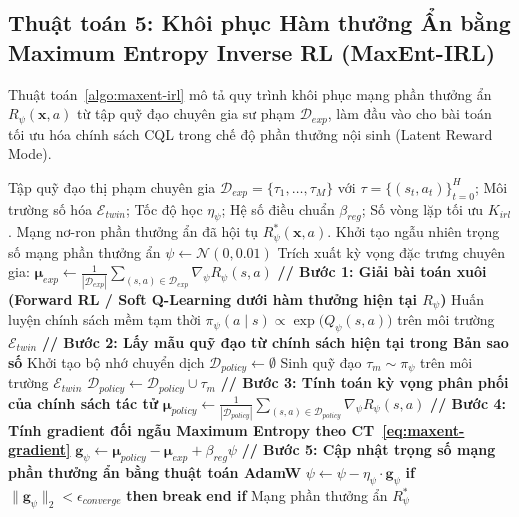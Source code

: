 \subsection{Thuật toán 5: Khôi phục Hàm thưởng Ẩn bằng Maximum Entropy Inverse RL (MaxEnt-IRL)}\label{subsec:algo-maxent-irl}
Thuật toán~\ref{algo:maxent-irl} mô tả quy trình khôi phục mạng phần thưởng ẩn $R_\psi(\mathbf{x}, a)$ từ tập quỹ đạo chuyên gia sư phạm $\mathcal{D}_{exp}$, làm đầu vào cho bài toán tối ưu hóa chính sách CQL trong chế độ phần thưởng nội sinh (Latent Reward Mode).

\begin{algorithm}[H]
\caption{Khôi phục Hàm thưởng Ẩn bằng Maximum Entropy Inverse RL (MaxEnt-IRL)}\label{algo:maxent-irl}
\begin{algorithmic}[1]
\Require Tập quỹ đạo thị phạm chuyên gia $\mathcal{D}_{exp} = \{\tau_1, \dots, \tau_M\}$ với $\tau = \{(s_t, a_t)\}_{t=0}^H$; Môi trường số hóa $\mathcal{E}_{twin}$; Tốc độ học $\eta_\psi$; Hệ số điều chuẩn $\beta_{reg}$; Số vòng lặp tối ưu $K_{irl}$.
\Ensure Mạng nơ-ron phần thưởng ẩn đã hội tụ $R_\psi^*(\mathbf{x}, a)$.
\State Khởi tạo ngẫu nhiên trọng số mạng phần thưởng ẩn $\psi \leftarrow \mathcal{N}(0, 0.01)$
\State Trích xuất kỳ vọng đặc trưng chuyên gia: $\bm{\mu}_{exp} \leftarrow \frac{1}{|\mathcal{D}_{exp}|} \sum_{(s, a) \in \mathcal{D}_{exp}} \nabla_\psi R_\psi(s, a)$
    \State \textbf{// Bước 1: Giải bài toán xuôi (Forward RL / Soft Q-Learning dưới hàm thưởng hiện tại $R_\psi$)}
    \State Huấn luyện chính sách mềm tạm thời $\pi_\psi(a \mid s) \propto \exp\big(Q_\psi(s, a)\big)$ trên môi trường $\mathcal{E}_{twin}$
    \State \textbf{// Bước 2: Lấy mẫu quỹ đạo từ chính sách hiện tại trong Bản sao số}
    \State Khởi tạo bộ nhớ chuyển dịch $\mathcal{D}_{policy} \leftarrow \emptyset$
        \State Sinh quỹ đạo $\tau_m \sim \pi_\psi$ trên môi trường $\mathcal{E}_{twin}$
        \State $\mathcal{D}_{policy} \leftarrow \mathcal{D}_{policy} \cup \tau_m$
    \EndFor
    \State \textbf{// Bước 3: Tính toán kỳ vọng phân phối của chính sách tác tử}
    \State $\bm{\mu}_{policy} \leftarrow \frac{1}{|\mathcal{D}_{policy}|} \sum_{(s, a) \in \mathcal{D}_{policy}} \nabla_\psi R_\psi(s, a)$
    \State \textbf{// Bước 4: Tính gradient đối ngẫu Maximum Entropy theo CT~\eqref{eq:maxent-gradient}}
    \State $\mathbf{g}_\psi \leftarrow \bm{\mu}_{policy} - \bm{\mu}_{exp} + \beta_{reg} \psi$
    \State \textbf{// Bước 5: Cập nhật trọng số mạng phần thưởng ẩn bằng thuật toán AdamW}
    \State $\psi \leftarrow \psi - \eta_\psi \cdot \mathbf{g}_\psi$
    \State \textbf{if} $\|\mathbf{g}_\psi\|_2 < \epsilon_{converge}$ \textbf{then}
        \State \textbf{break} 
    \State \textbf{end if}
\EndFor
\State \Return Mạng phần thưởng ẩn $R_\psi^*$
\end{algorithmic}
\end{algorithm}

\newpage

